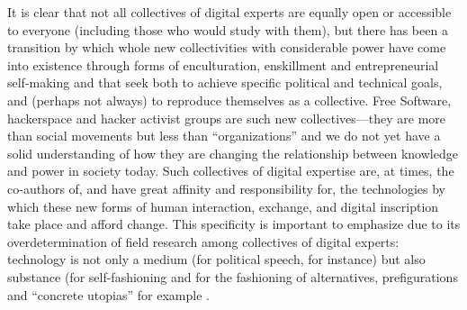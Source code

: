 \documentclass[10pt,letter,oneside]{scrartcl}
\begin{document}
It is clear that not all collectives of digital experts are equally
open or accessible to everyone (including those who would study with them),
but there has been a transition by which whole new collectivities with
considerable power have come into existence through forms of
enculturation, enskillment and entrepreneurial self-making and that
seek both to achieve specific political and technical goals, and
(perhaps not always) to reproduce themselves as a collective.  Free
Software, hackerspace and hacker activist groups are such new
collectives---they are more than social movements but less than
``organizations'' and we do not yet have a solid understanding of how
they are changing the relationship between knowledge and power in
society today. Such collectives of digital expertise are, at
times, the co-authors of, and have great affinity and responsibility
for, the technologies by which these new forms of human interaction,
exchange, and digital inscription take place and afford change. This
specificity is important to emphasize due to its overdetermination of
field research among collectives of digital experts: technology is not only a
medium (for political speech, for instance) but also substance (for
self-fashioning and for the fashioning of alternatives, prefigurations
\cite{Leach2013} and ``concrete utopias'' for example \cite{Bloch1986,Broca2012}. 



\end{document}
